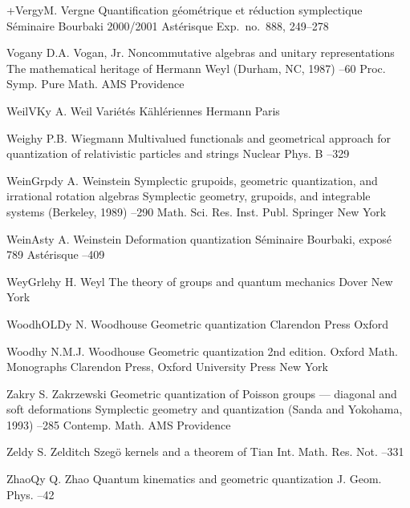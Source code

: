 \documentclass[12pt]{amsart}
\numberwithin{equation}{section}
\theoremstyle{remark}
\newcommand{\by}{\mathbf y}
\begin{document}
\begin{thebibliography}{199}
 +Verg\by{M. Vergne \paper Quantification g\'eom\'etrique et r\'eduction
symplectique \paperinfo S\'eminaire Bourbaki 2000/2001 \jour Ast\'erisque   \pages Exp.~no.~888, 249--278}

 Vogan\by{ D.A. Vogan, Jr. \paper Noncommutative algebras and unitary
representations \inbook The mathematical heritage of Hermann Weyl (Durham, NC,
1987) --60 \bookinfo Proc. Symp. Pure Math.  \publ AMS
\publaddr Providence }

 WeilVK\by{ A. Weil \book Vari\'et\'es K\"ahl\'eriennes \publ Hermann
\publaddr Paris }

 Weigh\by{ P.B. Wiegmann \paper Multivalued functionals and geometrical
approach for quantization of relativistic particles and strings \jour Nuclear
Phys. B   --329}

 WeinGrpd\by{ A. Weinstein \paper Symplectic grupoids, geometric
quantization, and irrational rotation algebras \inbook Symplectic geometry,
grupoids, and integrable systems (Berkeley, 1989) --290 \bookinfo
Math. Sci. Res. Inst. Publ.  \publ Springer \publaddr New York }

 WeinAst\by{ A. Weinstein \paper Deformation quantization \paperinfo
S\'eminaire Bourbaki, expos\'e 789 \jour Ast\'erisque   --409}

 WeyGrleh\by{ H. Weyl \book The theory of groups and quantum mechanics
\publ Dover \publaddr New York }

 WoodhOLD\by{ N. Woodhouse \book Geometric quantization \publ Clarendon
Press \publaddr Oxford }

 Woodh\by{ N.M.J. Woodhouse \book Geometric quantization \bookinfo 2nd
edition. Oxford Math. Monographs \publ Clarendon Press, Oxford University Press
\publaddr New York }

 Zakr\by{ S. Zakrzewski \paper Geometric quantization of Poisson groups
--- diagonal and soft deformations \inbook Symplectic geometry and quantization
(Sanda and Yokohama, 1993) --285 \bookinfo Contemp. Math. 
\publ AMS \publaddr Providence }

 Zeld\by{ S. Zelditch \paper Szeg\"o kernels and a theorem of Tian
\jour Int. Math. Res. Not.   --331}

 ZhaoQ\by{ Q. Zhao \paper Quantum kinematics and geometric quantization
\jour J. Geom. Phys.   --42}

\end{thebibliography}
\end{document}
